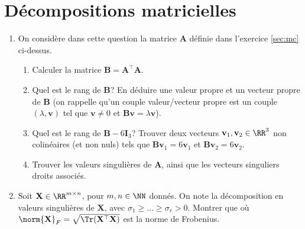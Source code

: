\documentclass[11pt]{article}
\begin{document}
\section{Décompositions matricielles}
\begin{enumerate}
	
	
	
	\item On considère dans cette question la matrice $\mathbf{A}$ définie dans l'exercice \ref{sec:mc} ci-dessus.
	\begin{enumerate}
		\item Calculer la matrice $\mathbf{B} = \mathbf{A}^\top \mathbf{A}$.
		\item Quel est le rang de $\mathbf{B}$? En déduire une valeur propre et un vecteur propre de $\mathbf{B}$ (on rappelle qu'un couple valeur/vecteur propre est un couple $(\lambda,\mathbf{v})$ tel que $\mathbf{v}\neq 0$ et $\mathbf{B}\mathbf{v} = \lambda \mathbf{v}$).
		\item Quel est le rang de $\mathbf{B}-6\mathbf{I}_3$? Trouver deux vecteurs $\mathbf{v}_1,\mathbf{v}_2 \in \RR^3$ non colinéaires (et non nuls) tels que $\mathbf{B}\mathbf{v}_1=6\mathbf{v}_1$ et $\mathbf{B}\mathbf{v}_2=6\mathbf{v}_2$.
		\item Trouver les valeurs singulières de $\mathbf{A}$, ainsi que les vecteurs singuliers droits associés.
	\end{enumerate}
	
	\item Soit $\mathbf{X} \in \RR^{m\times n}$, pour $m,n \in \NN$ donnés. On note
	la décomposition en valeurs singulières de $\mathbf{X}$, avec $\sigma_1 \geq \ldots \geq \sigma_r > 0$. Montrer que  où $\norm{\mathbf{X}}_F = \sqrt{\Tr(\mathbf{X}^\top \mathbf{X})}$ est la norme de Frobenius.
	
\end{enumerate}
 
\end{document}

